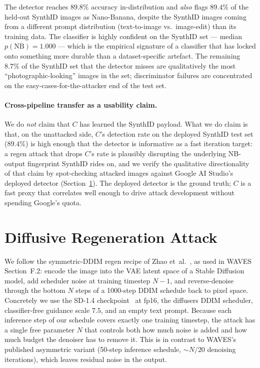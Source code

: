 \documentclass[11pt]{article}
\begin{document}
The detector reaches $89.8\%$ accuracy in-distribution and \emph{also}
flags $89.4\%$ of the held-out SynthID images as Nano-Banana, despite
the SynthID images coming from a different prompt distribution
(text-to-image vs.\ image-edit) than its training data. The classifier
is highly confident on the SynthID set --- median $p(\mathrm{NB}){=}1.000$
--- which is the empirical signature of a classifier that has locked
onto something more durable than a dataset-specific artefact. The
remaining $8.7\%$ of the SynthID set that the detector misses are
qualitatively the most ``photographic-looking'' images in the set;
discriminator failures are concentrated on the easy-cases-for-the-attacker
end of the test set.

\paragraph{Cross-pipeline transfer as a usability claim.}
We do \emph{not} claim that $C$ has learned the SynthID payload. What we
do claim is that, on the unattacked side, $C$'s detection rate on the
deployed SynthID test set ($89.4\%$) is high enough that the detector
is informative as a fast iteration target: a regen attack that drops
$C$'s rate is plausibly disrupting the underlying NB-output fingerprint
SynthID rides on, and we verify the qualitative directionality of that
claim by spot-checking attacked images against Google AI Studio's
deployed detector (Section~\ref{sec:regen}). The deployed detector
is the ground truth; $C$ is a fast proxy that correlates well enough
to drive attack development without spending Google's quota.

\section{Diffusive Regeneration Attack}
\label{sec:regen}

We follow the symmetric-DDIM regen recipe of Zhao
et~al.~\citep{zhao2023provable}, as used in WAVES Section~F.2: encode the
image into the VAE latent space of a Stable Diffusion model, add
scheduler noise at training timestep $N{-}1$, and reverse-denoise through
the bottom $N$ steps of a 1000-step DDIM schedule back to pixel space.
Concretely we use the SD-1.4 checkpoint~\citep{rombach2022stable} at fp16,
the diffusers DDIM scheduler, classifier-free guidance scale $7.5$, and an
empty text prompt. Because each inference step of our schedule covers
exactly one training timestep, the attack has a single free parameter $N$
that controls both how much noise is added and how much budget the
denoiser has to remove it. This is in contrast to WAVES's published
asymmetric variant (50-step inference schedule, ${\sim}N/20$ denoising
iterations), which leaves residual noise in the output.
\end{document}
